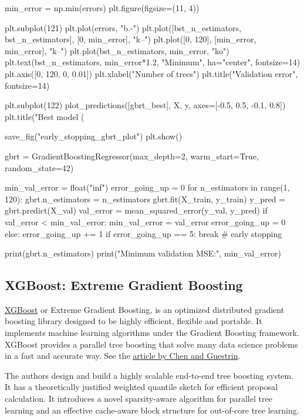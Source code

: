 \documentclass[%
oneside,                 %
final,                   %
10pt]{article}
\begin{document}
min_error = np.min(errors)
plt.figure(figsize=(11, 4))

plt.subplot(121)
plt.plot(errors, "b.-")
plt.plot([bst_n_estimators, bst_n_estimators], [0, min_error], "k--")
plt.plot([0, 120], [min_error, min_error], "k--")
plt.plot(bst_n_estimators, min_error, "ko")
plt.text(bst_n_estimators, min_error*1.2, "Minimum", ha="center", fontsize=14)
plt.axis([0, 120, 0, 0.01])
plt.xlabel("Number of trees")
plt.title("Validation error", fontsize=14)

plt.subplot(122)
plot_predictions([gbrt_best], X, y, axes=[-0.5, 0.5, -0.1, 0.8])
plt.title("Best model (%

save_fig("early_stopping_gbrt_plot")
plt.show()


gbrt = GradientBoostingRegressor(max_depth=2, warm_start=True, random_state=42)

min_val_error = float("inf")
error_going_up = 0
for n_estimators in range(1, 120):
    gbrt.n_estimators = n_estimators
    gbrt.fit(X_train, y_train)
    y_pred = gbrt.predict(X_val)
    val_error = mean_squared_error(y_val, y_pred)
    if val_error < min_val_error:
        min_val_error = val_error
        error_going_up = 0
    else:
        error_going_up += 1
        if error_going_up == 5:
            break  # early stopping


print(gbrt.n_estimators)
print("Minimum validation MSE:", min_val_error)
\epycod

\subsection{XGBoost: Extreme Gradient Boosting}


\href{{https://github.com/dmlc/xgboost}}{XGBoost} or Extreme Gradient
Boosting, is an optimized distributed gradient boosting library
designed to be highly efficient, flexible and portable. It implements
machine learning algorithms under the Gradient Boosting
framework. XGBoost provides a parallel tree boosting that solve many
data science problems in a fast and accurate way. See the \href{{https://arxiv.org/abs/1603.02754}}{article by Chen and Guestrin}.

The authors design and build a highly scalable end-to-end tree
boosting system. It has  a theoretically justified weighted quantile
sketch for efficient proposal calculation. It introduces a novel sparsity-aware algorithm for parallel tree learning and an effective cache-aware block structure for out-of-core tree learning.
\end{document}
